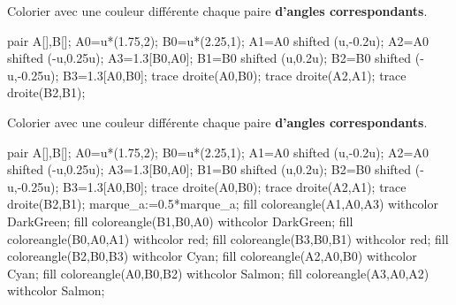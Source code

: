 \begin{exercice*}
    Colorier avec une couleur différente chaque paire \textbf{d'angles correspondants}.
    \par\smallskip
    \begin{center}
        \begin{Geometrie}[CoinHD={(3.5u,3u)}]
            pair A[],B[];
            A0=u*(1.75,2);
            B0=u*(2.25,1);
            A1=A0 shifted (u,-0.2u);
            A2=A0 shifted (-u,0.25u);
            A3=1.3[B0,A0];
            B1=B0 shifted (u,0.2u);
            B2=B0 shifted (-u,-0.25u);
            B3=1.3[A0,B0];
            trace droite(A0,B0);
            trace droite(A2,A1);
            trace droite(B2,B1);
        \end{Geometrie}
    \end{center}
\end{exercice*}
\begin{corrige}
    Colorier avec une couleur différente chaque paire \textbf{d'angles correspondants}.
    \par\smallskip
    \begin{center}
        \begin{Geometrie}[CoinHD={(3.5u,3u)}]
            pair A[],B[];
            A0=u*(1.75,2);
            B0=u*(2.25,1);
            A1=A0 shifted (u,-0.2u);
            A2=A0 shifted (-u,0.25u);
            A3=1.3[B0,A0];
            B1=B0 shifted (u,0.2u);
            B2=B0 shifted (-u,-0.25u);
            B3=1.3[A0,B0];
            trace droite(A0,B0);
            trace droite(A2,A1);
            trace droite(B2,B1);
            marque_a:=0.5*marque_a;
            fill coloreangle(A1,A0,A3) withcolor DarkGreen;
            fill coloreangle(B1,B0,A0) withcolor DarkGreen;
            fill coloreangle(B0,A0,A1) withcolor red;
            fill coloreangle(B3,B0,B1) withcolor red;
            fill coloreangle(B2,B0,B3) withcolor Cyan;
            fill coloreangle(A2,A0,B0) withcolor Cyan;
            fill coloreangle(A0,B0,B2) withcolor Salmon;
            fill coloreangle(A3,A0,A2) withcolor Salmon;
        \end{Geometrie}
    \end{center}
\end{corrige}